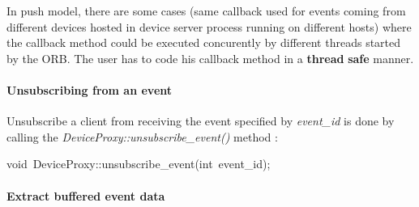 In push model, there are some cases (same callback used for events
coming from different devices hosted in device server process running
on different hosts) where the callback method could be executed concurently
by different threads started by the ORB. The user has to code his
callback method in a \textbf{thread} \textbf{safe}
manner.

\paragraph{Unsubscribing from an event }

Unsubscribe a client from receiving the event specified by \emph{event\_id}
is done by calling the \emph{DeviceProxy::unsubscribe\_event()}
method :
\begin{lyxcode}
void~DeviceProxy::unsubscribe\_event(int~event\_id);

\end{lyxcode}

\paragraph{Extract buffered event data}

